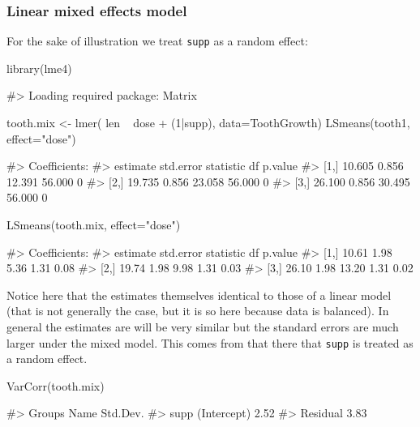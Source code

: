 \hypertarget{linear-mixed-effects-model}{%
\subsubsection{Linear mixed effects
model}\label{linear-mixed-effects-model}}

For the sake of illustration we treat \verb|supp| as a random effect:

\begin{Schunk}
\begin{Sinput}
library(lme4)
\end{Sinput}
\begin{Soutput}
#> Loading required package: Matrix
\end{Soutput}
\begin{Sinput}
tooth.mix <- lmer( len ~ dose  + (1|supp), data=ToothGrowth)
LSmeans(tooth1, effect="dose")
\end{Sinput}
\begin{Soutput}
#> Coefficients:
#>      estimate std.error statistic     df p.value
#> [1,]   10.605     0.856    12.391 56.000       0
#> [2,]   19.735     0.856    23.058 56.000       0
#> [3,]   26.100     0.856    30.495 56.000       0
\end{Soutput}
\begin{Sinput}
LSmeans(tooth.mix, effect="dose")
\end{Sinput}
\begin{Soutput}
#> Coefficients:
#>      estimate std.error statistic    df p.value
#> [1,]    10.61      1.98      5.36  1.31    0.08
#> [2,]    19.74      1.98      9.98  1.31    0.03
#> [3,]    26.10      1.98     13.20  1.31    0.02
\end{Soutput}
\end{Schunk}

Notice here that the estimates themselves identical to those of a linear
model (that is not generally the case, but it is so here because data is
balanced). In general the estimates are will be very similar but the
standard errors are much larger under the mixed model. This comes from
that there that \texttt{supp} is treated as a random effect.

\begin{Schunk}
\begin{Sinput}
VarCorr(tooth.mix)
\end{Sinput}
\begin{Soutput}
#>  Groups   Name        Std.Dev.
#>  supp     (Intercept) 2.52    
#>  Residual             3.83
\end{Soutput}
\end{Schunk}

